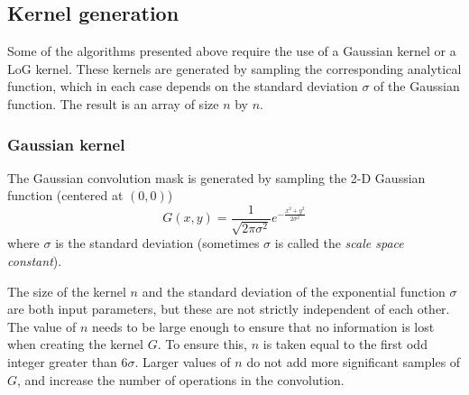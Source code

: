 \documentclass{ipol}
\numberwithin{equation}{section}
\numberwithin{table}{section}
\begin{document}


\subsection{Kernel generation}

Some of the algorithms presented above require the use of a Gaussian kernel or a LoG kernel. These 
kernels are generated by sampling the corresponding analytical function, which in each case depends 
on the standard deviation $\sigma$ of the Gaussian function. The result is an array of 
size $n$ by $n$.



\subsubsection{Gaussian kernel}

The Gaussian convolution mask is generated by sampling the 2-D Gaussian function (centered at $(0,0)$)
\begin{equation}
	\label{eq:gaussian_function}
	G(x,y) = \frac{1}{\sqrt{2\pi\sigma^2}}e^{-\frac{x^2+y^2}{2\sigma^2}}
\end{equation}
where $\sigma$ is the standard deviation (sometimes $\sigma$ is called the \textit{scale space constant}).

The size of the kernel $n$ and the standard deviation of the exponential function $\sigma$ are both 
input parameters, but these are not strictly independent of each other. 
The value of $n$ needs to be large enough to ensure that no information is lost when creating the kernel $G$. To ensure this, $n$ is taken equal to the first odd integer greater than $6\sigma$. Larger values of $n$ do not add more significant samples ​​of $G$, and increase the number of operations in the convolution.
\end{document}
